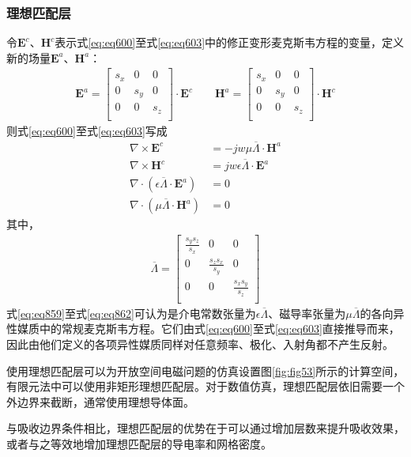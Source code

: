 \documentclass{article}
\numberwithin{equation}{section}
\begin{document}
\subsubsection{理想匹配层}
令$\mathbf{E}^c$、$\mathbf{H}^c$表示式\ref{eq:eq600}至式\ref{eq:eq603}中的修正变形麦克斯韦方程的变量，定义新的场量$\mathbf{E}^a$、$\mathbf{H}^a$：
\begin{align}
    \label{eq:eq858}
    \mathbf{E}^a=
    \left[
        \begin{matrix}
            s_x & 0 & 0 \\
            0 & s_y & 0 \\
            0 & 0 & s_z \\
        \end{matrix}
    \right]
    \cdot\mathbf{E}^c
    \qquad
    \mathbf{H}^a=
    \left[
        \begin{matrix}
            s_x & 0 & 0 \\
            0 & s_y & 0 \\
            0 & 0 & s_z \\
        \end{matrix}
    \right]
    \cdot\mathbf{H}^c
\end{align}
则式\ref{eq:eq600}至式\ref{eq:eq603}写成
\begin{align}
    \label{eq:eq859}
    \nabla \times \mathbf{E}^c&=-jw\mu\overline{\Lambda}\cdot\mathbf{H}^a \\
    \label{eq:eq860}
    \nabla \times \mathbf{H}^c&=jw\epsilon\overline{\Lambda}\cdot\mathbf{E}^a \\
    \label{eq:eq861}
    \nabla \cdot (\epsilon\overline{\Lambda}\cdot\mathbf{E}^a)&=0 \\
    \label{eq:eq862}
    \nabla \cdot (\mu\overline{\Lambda}\cdot\mathbf{H}^a)&=0
\end{align}
其中，
\begin{align}
    \label{eq:eq863}
    \overline{\Lambda}=
    \left[
        \begin{matrix}
            \frac{s_ys_z}{s_x} & 0 & 0 \\
            0 & \frac{s_zs_x}{s_y} & 0 \\
            0 & 0 & \frac{s_xs_y}{s_z} \\
        \end{matrix}
    \right]
\end{align}
式\ref{eq:eq859}至式\ref{eq:eq862}可认为是介电常数张量为$\epsilon\overline{\Lambda}$、磁导率张量为$\mu\overline{\Lambda}$的各向异性媒质中的常规麦克斯韦方程。它们由式\ref{eq:eq600}至式\ref{eq:eq603}直接推导而来，因此由他们定义的各项异性媒质同样对任意频率、极化、入射角都不产生反射。\par
使用理想匹配层可以为开放空间电磁问题的仿真设置图\ref{fig:fig53}所示的计算空间，有限元法中可以使用非矩形理想匹配层。对于数值仿真，理想匹配层依旧需要一个外边界来截断，通常使用理想导体面。\par
与吸收边界条件相比，理想匹配层的优势在于可以通过增加层数来提升吸收效果，或者与之等效地增加理想匹配层的导电率和网格密度。
\end{document}
